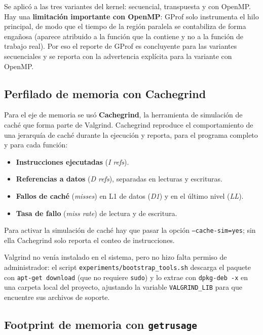 Se aplicó a las tres variantes del kernel: secuencial, transpuesta y con OpenMP. Hay una \textbf{limitación importante con OpenMP}: GProf solo instrumenta el hilo principal, de modo que el tiempo de la región paralela se contabiliza de forma engañosa (aparece atribuido a la función que la contiene y no a la función de trabajo real). Por eso el reporte de GProf es concluyente para las variantes secuenciales y se reporta con la advertencia explícita para la variante con OpenMP.

\subsection{Perfilado de memoria con Cachegrind}

Para el eje de memoria se usó \textbf{Cachegrind}, la herramienta de simulación de caché que forma parte de Valgrind. Cachegrind reproduce el comportamiento de una jerarquía de caché durante la ejecución y reporta, para el programa completo y para cada función:

\begin{itemize}
    \item \textbf{Instrucciones ejecutadas} (\textit{I refs}).
    \item \textbf{Referencias a datos} (\textit{D refs}), separadas en lecturas y escrituras.
    \item \textbf{Fallos de caché} (\textit{misses}) en L1 de datos (\textit{D1}) y en el último nivel (\textit{LL}).
    \item \textbf{Tasa de fallo} (\textit{miss rate}) de lectura y de escritura.
\end{itemize}

Para activar la simulación de caché hay que pasar la opción \texttt{--cache-sim=yes}; sin ella Cachegrind solo reporta el conteo de instrucciones.

Valgrind no venía instalado en el sistema, pero no hizo falta permiso de administrador: el script \texttt{experiments/bootstrap\_tools.sh} descarga el paquete con \texttt{apt-get download} (que no requiere \texttt{sudo}) y lo extrae con \texttt{dpkg-deb -x} en una carpeta local del proyecto, ajustando la variable \texttt{VALGRIND\_LIB} para que encuentre sus archivos de soporte.

\subsection{Footprint de memoria con \texttt{getrusage}}

